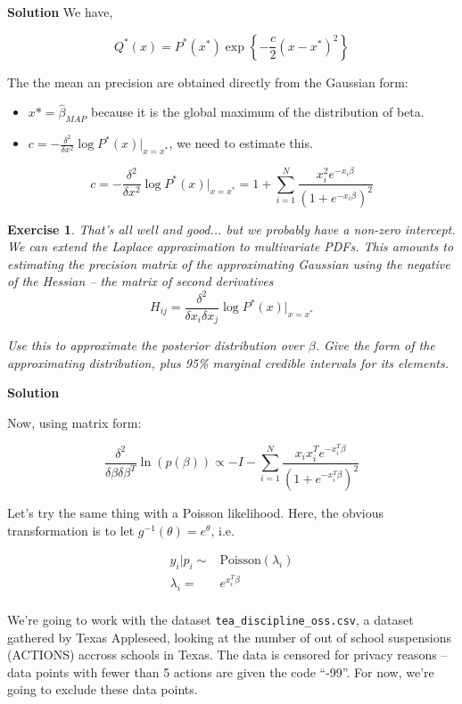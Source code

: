 \documentclass[twoside]{article}
\newcounter{lecnum}
\newtheorem{exercise}{Exercise}[lecnum]
\begin{document}
{\color{blue}
	\textbf{Solution}
	We have,
	
	$$Q^*(x) = P^*(x^*)\exp\left\{-\frac{c}{2}(x-x^*)^2\right\}$$
	
	The the mean an precision are obtained directly from the Gaussian form:
	\begin{itemize}
		\item $x* = \hat{\beta}_{MAP}$ because it is the global maximum of the distribution of beta.
		\item $c = -\frac{\delta^2}{\delta x^2}\log P^*(x)\Big\rvert_{x=x^*} $, we need to estimate this.
	\end{itemize}
	$$ c = -\frac{\delta^2}{\delta x^2}\log P^*(x)\Big\rvert_{x=x^*} 
	= 1 + \sum_{i=1}^{N} \frac{x_i^2 e^{-x_i \beta}}{(1+e^{-x_i \beta})^2} 
	$$
} %



\begin{exercise}
  That's all well and good... but we probably have a non-zero intercept.  We can extend the Laplace approximation to multivariate PDFs. This amounts to estimating the precision matrix of the approximating Gaussian using the negative of the Hessian -- the matrix of second derivatives
$$H_{ij} = \frac{\delta^2}{\delta x_i \delta x_j}\log P^*(x)\Big\rvert_{x=x^*}$$

  Use this to approximate the posterior distribution over $\beta$. Give the form of the approximating distribution, plus 95\% marginal credible intervals for its elements.
\end{exercise}


{\color{blue}
	\textbf{Solution}

Now, using matrix form:

$$
\frac{\delta^2}{\delta  \beta \delta \beta^T }\ln (p(\beta)) \propto
-I - \sum_{i=1}^{N} \frac{x_i x_i^T e^{-x_i^T \beta}}{(1+e^{-x_i^T \beta})^2} 
$$
	
} %

  Let's try the same thing with a Poisson likelihood. Here, the obvious transformation is to let $g^{-1}(\theta) = e^{\theta}$, i.e.

$$\begin{aligned}
  y_i|p_i \sim& \mbox{Poisson}(\lambda_i)\\
  \lambda_i =& e^{x_i^T\beta}\\
\end{aligned}$$

  We're going to work with the dataset \texttt{tea\_discipline\_oss.csv}, a dataset gathered by Texas Appleseed, looking at the number of out of school suspensions (ACTIONS) accross schools in Texas. The data is censored for privacy reasons -- data points with fewer than 5 actions are given the code ``-99''. For now, we're going to exclude these data points. 
\end{document}

